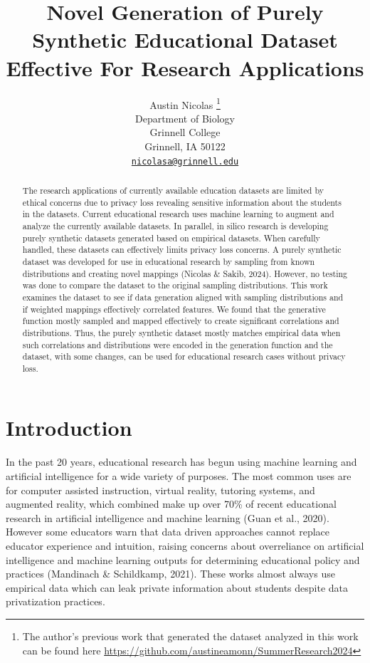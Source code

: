 \documentclass{article}
\title{Novel Generation of Purely Synthetic Educational Dataset Effective For Research Applications}
\author{
    Austin Nicolas
    \thanks{The author's previous work that generated the dataset analyzed in this work can be found here \url{https://github.com/austineamonn/SummerResearch2024}}
   \\
    Department of Biology \\
    Grinnell College \\
  Grinnell, IA 50122 \\
  \texttt{\href{mailto:nicolasa@grinnell.edu}{\nolinkurl{nicolasa@grinnell.edu}}} \\
  }
\begin{document}
\maketitle


\begin{abstract}
The research applications of currently available education datasets are limited by ethical concerns due to privacy loss revealing sensitive information about the students in the datasets. Current educational research uses machine learning to augment and analyze the currently available datasets. In parallel, in silico research is developing purely synthetic datasets generated based on empirical datasets. When carefully handled, these datasets can effectively limits privacy loss concerns. A purely synthetic dataset was developed for use in educational research by sampling from known distributions and creating novel mappings (Nicolas \& Sakib, 2024). However, no testing was done to compare the dataset to the original sampling distributions. This work examines the dataset to see if data generation aligned with sampling distributions and if weighted mappings effectively correlated features. We found that the generative function mostly sampled and mapped effectively to create significant correlations and distributions. Thus, the purely synthetic dataset mostly matches empirical data when such correlations and distributions were encoded in the generation function and the dataset, with some changes, can be used for educational research cases without privacy loss.
\end{abstract}


\section{Introduction}\label{introduction}

In the past 20 years, educational research has begun using machine learning and artificial intelligence for a wide variety of purposes. The most common uses are for computer assisted instruction, virtual reality, tutoring systems, and augmented reality, which combined make up over 70\% of recent educational research in artificial intelligence and machine learning (Guan et al., 2020). However some educators warn that data driven approaches cannot replace educator experience and intuition, raising concerns about overreliance on artificial intelligence and machine learning outputs for determining educational policy and practices (Mandinach \& Schildkamp, 2021). These works almost always use empirical data which can leak private information about students despite data privatization practices.
\end{document}
